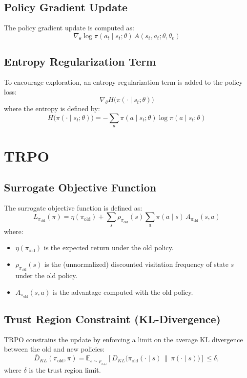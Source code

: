 \documentclass[conference]{IEEEtran}
\begin{document}
\subsection{Policy Gradient Update}
The policy gradient update is computed as:
\begin{equation}
\nabla_{\theta} \log \pi(a_t \mid s_t; \theta)\, A(s_t, a_t; \theta, \theta_v)
\end{equation}

\subsection{Entropy Regularization Term}
To encourage exploration, an entropy regularization term is added to the policy loss:
\begin{equation}
\nabla_{\theta} H\big(\pi(\cdot \mid s_t; \theta)\big)
\end{equation}
where the entropy is defined by:
\begin{equation}
H\big(\pi(\cdot \mid s_t; \theta)\big) = -\sum_{a} \pi(a \mid s_t; \theta) \log \pi(a \mid s_t; \theta)
\end{equation}

\section{TRPO}
\subsection{Surrogate Objective Function}
The surrogate objective function is defined as:
\begin{equation}
L_{\pi_{\text{old}}}(\pi) = \eta(\pi_{\text{old}}) + \sum_{s} \rho_{\pi_{\text{old}}}(s) \sum_{a} \pi(a \mid s)\, A_{\pi_{\text{old}}}(s,a)
\end{equation}
where:
\begin{itemize}
    \item \( \eta(\pi_{\text{old}}) \) is the expected return under the old policy.
    \item \( \rho_{\pi_{\text{old}}}(s) \) is the (unnormalized) discounted visitation frequency of state \( s \) under the old policy.
    \item \( A_{\pi_{\text{old}}}(s,a) \) is the advantage computed with the old policy.
\end{itemize}

\subsection{Trust Region Constraint (KL-Divergence)}
TRPO constrains the update by enforcing a limit on the average KL divergence between the old and new policies:
\begin{equation}
\bar{D}_{KL}(\pi_{\text{old}}, \pi) = \mathbb{E}_{s\sim \rho_{\pi_{\text{old}}}}\left[D_{KL}\big(\pi_{\text{old}}(\cdot \mid s) \,\|\, \pi(\cdot \mid s)\big)\right] \leq \delta,
\end{equation}
where \( \delta \) is the trust region limit.
\end{document}
